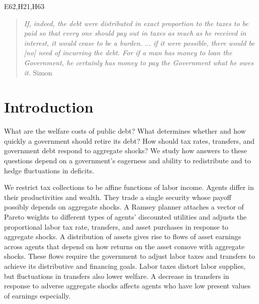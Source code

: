 \documentclass[thmsb,11pt]{article}
\begin{document}
 E62,H21,H63
\thispagestyle{empty}\bigskip

\bigskip \newpage

\setcounter{page}{1}

\bigskip \baselineskip0.65cm


%


%

 \begin{quote}
 \emph{If, indeed, the debt were distributed in exact proportion to the taxes
 to be paid so that every one should pay out in taxes as much as he received
 in interest, it would cease to be a burden.%
 $\ldots$ if it were possible, there
 would be [no] need of incurring the debt. For if a man has money to loan the
 Government, he certainly has money to pay the Government what he owes it.
 }Simon \citet[p.85]{newcomb1865critical}
 \end{quote}



\section{Introduction}
\color{black}
What are the welfare costs of public debt? What determines whether and how quickly a government should retire its debt? How should  tax rates, transfers, and government debt respond to aggregate shocks? We study how answers to these questions depend on a government's
eagerness and ability to redistribute
and to hedge fluctuations in deficits.

We restrict tax collections to be   affine functions of labor income. Agents differ in
their productivities and wealth.  They  trade a single  security whose payoff possibly depends on aggregate shocks.
A Ramsey planner attaches  a  vector of Pareto weights to different types of agents' discounted utilities and adjusts
the proportional labor  tax rate, transfers, and asset purchases in response to aggregate shocks. A distribution of assets  gives rise to  flows of asset earnings across  agents that depend on how returns on the asset comove with aggregate shocks. These
  flows require the government  to adjust labor taxes and transfers  to achieve its distributive and financing goals. Labor taxes distort  labor supplies, but fluctuations in  transfers also lower welfare. A decrease in transfers in response to adverse aggregate shocks  affects agents who have low present values of earnings especially.
\end{document}
